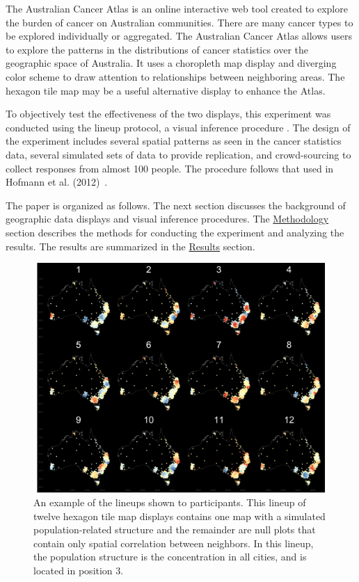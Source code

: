 \documentclass[journal]{vgtc}                     %
\begin{document}
The Australian Cancer Atlas \cite{atlas} is an online interactive web tool created to explore the burden of cancer on Australian communities. There are many cancer types to be explored individually or aggregated. The Australian Cancer Atlas allows users to explore the patterns in the distributions of cancer statistics over the geographic space of Australia. It uses a choropleth map display and diverging color scheme to draw attention to relationships between neighboring areas. The hexagon tile map may be a useful alternative display to enhance the Atlas.

To objectively test the effectiveness of the two displays, this experiment was conducted using the lineup protocol, a visual inference procedure \cite{GIIV}. The design of the experiment includes several spatial patterns as seen in the cancer statistics data, several simulated sets of data to provide replication, and crowd-sourcing to collect responses from almost 100 people. The procedure follows that used in Hofmann et al. (2012)~\cite{GTPCCD}. 

The paper is organized as follows. The next section discusses the background of geographic data displays and visual inference procedures. The \protect\hyperlink{methodology}{Methodology} section describes the methods for conducting the experiment and analyzing the results. The results are summarized in the \protect\hyperlink{results}{Results} section.

\begin{figure}[t]
\centering
\includegraphics[width=0.98\linewidth]{paper_files/figure-latex/lineup-1} \caption{An example of the lineups shown to participants. This lineup of twelve hexagon tile map displays contains one map with a simulated population-related structure and the remainder are null plots that contain only spatial correlation between neighbors. In this lineup, the population structure is the concentration in all cities, and is located in position 3.}\label{fig:lineup}
\end{figure}
\end{document}
